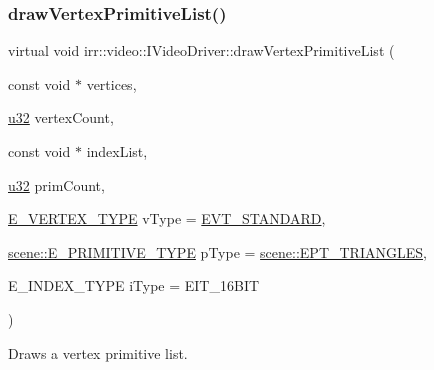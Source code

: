 \subsubsection{\texorpdfstring{draw\+Vertex\+Primitive\+List()}{drawVertexPrimitiveList()}\hspace{0.1cm}{\footnotesize\ttfamily [2/2]}}
{\footnotesize\ttfamily virtual void irr\+::video\+::\+I\+Video\+Driver\+::draw\+Vertex\+Primitive\+List (\begin{DoxyParamCaption}\item[{const void $\ast$}]{vertices,  }\item[{\hyperlink{namespaceirr_a0416a53257075833e7002efd0a18e804}{u32}}]{vertex\+Count,  }\item[{const void $\ast$}]{index\+List,  }\item[{\hyperlink{namespaceirr_a0416a53257075833e7002efd0a18e804}{u32}}]{prim\+Count,  }\item[{\hyperlink{namespaceirr_1_1video_a0e3b59e025e0d0db0ed2ee0ce904deac}{E\+\_\+\+V\+E\+R\+T\+E\+X\+\_\+\+T\+Y\+PE}}]{v\+Type = {\ttfamily \hyperlink{namespaceirr_1_1video_a0e3b59e025e0d0db0ed2ee0ce904deaca921f287a4f48d612a5be2d89453ca262}{E\+V\+T\+\_\+\+S\+T\+A\+N\+D\+A\+RD}},  }\item[{\hyperlink{namespaceirr_1_1scene_a5d7de82f2169761194b2f44d95cdc1dc}{scene\+::\+E\+\_\+\+P\+R\+I\+M\+I\+T\+I\+V\+E\+\_\+\+T\+Y\+PE}}]{p\+Type = {\ttfamily \hyperlink{namespaceirr_1_1scene_a5d7de82f2169761194b2f44d95cdc1dca6c884c4de3210b3ed36c99fb828ce376}{scene\+::\+E\+P\+T\+\_\+\+T\+R\+I\+A\+N\+G\+L\+ES}},  }\item[{E\+\_\+\+I\+N\+D\+E\+X\+\_\+\+T\+Y\+PE}]{i\+Type = {\ttfamily EIT\+\_\+16BIT} }\end{DoxyParamCaption})\hspace{0.3cm}{\ttfamily [pure virtual]}}



Draws a vertex primitive list. 

